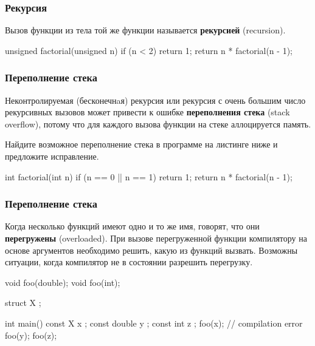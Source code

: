 \documentclass[compress, 8pt]{beamer}
\begin{document}
\begin{frame}[fragile]

    \frametitle{Рекурсия}

    Вызов функции из тела той же функции называется \textbf{рекурсией} (recursion).

    \begin{myinplacelisting}[minted language=cpp]
unsigned factorial(unsigned n) {
    if (n < 2) {
        return 1;
    }
    return n * factorial(n - 1);
}
    \end{myinplacelisting}

\end{frame}

\begin{frame}[fragile]

    \frametitle{Переполнение стека}

    Неконтролируемая (бесконечнaя) рекурсия или рекурсия с очень большим число рекурсивных
    вызовов может привести к ошибке \textbf{переполнения стека}\footnotemark{}
    (stack overflow), потому что для каждого вызова функции на стеке аллоцируется память.


    \begin{task}
        Найдите возможное переполнение стека в программе на листинге ниже и предложите
        исправление.
    \end{task}

    \begin{myinplacelisting}[%
        minted language=cpp,
        minted options={
            fontsize=\normalsize,
            breaklines,
            breakanywhere,
            linenos,
            escapeinside=??,
            numbersep=2pt
        },
    ]
int factorial(int n) {
    if (n == 0 || n == 1) {
        return 1;
    }
    return n * factorial(n - 1);
}
    \end{myinplacelisting}

\end{frame}

\begin{frame}[fragile]

    \frametitle{Переполнение стека}

    Когда несколько функций имеют одно и то же имя, говорят, что они
    \textbf{перегружены}\footnotemark{} (overloaded).
    При вызове перегруженной функции компилятору на основе аргументов
    необходимо решить, какую из функций вызвать.
    Возможны ситуации, когда компилятор не в состоянии разрешить перегрузку.


    \begin{myinplacelisting}[minted language=cpp]
void foo(double);
void foo(int);

struct X {};

int main() {
    const X x {};
    const double y {};
    const int z {};
    foo(x); // compilation error
    foo(y);
    foo(z);
}
    \end{myinplacelisting}

\end{frame}
\end{document}

